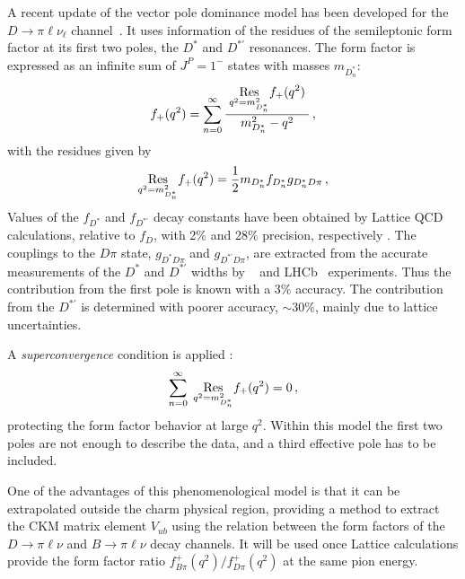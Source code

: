 A recent update of the vector pole dominance model has been developed for the $D \to \pi \ell \nu_\ell$ channel~\cite{Becirevic:2014kaa}.
It uses information of the residues of the semileptonic form factor at its first two poles, the $D^\ast$ 
and $D^{\ast '}$ resonances.  
The form factor is expressed as an infinite sum of $J^P =1^-$ states with masses $m_{D^\ast_n}$: 
\begin{eqnarray}
f_+(q^2) = \sum_{n=0}^\infty { \; \displaystyle{\underset{q^2= m_{D^\ast_n}^2}{\rm Res}} f_+(q^2)\;\over m_{D^\ast_n}^2-q^2} \,,
\label{ThreePole}
\end{eqnarray}
with the residues given by 
\begin{eqnarray}
\displaystyle{\underset{q^2=m_{D_n^\ast}^2}{\rm Res}} f_+(q^2)= {1\over 2} m_{D_n^\ast} f_{D_n^\ast} g_{D_n^\ast D\pi}\,, 
\label{Residua}
\end{eqnarray}
Values of the $f_{D^\ast}$ and $f_{D^{\ast '}}$ decay constants have been obtained by Lattice QCD calculations, 
relative to $f_{D}$, with 2$\%$ and 28$\%$ precision, respectively \cite{Becirevic:2014kaa}. 
The couplings to the $D\pi$ state, $g_{D^\ast D\pi}$ and $g_{D^{\ast '} D\pi}$, are extracted from the accurate 
measurements of the $D^\ast$ and  $D^{\ast '}$ widths by \babar~\cite{Lees:2013uxa,delAmoSanchez:2010vq} and LHCb~\cite{Aaij:2013sza} experiments. 
Thus the contribution from the first pole is known with a $3\%$ accuracy. 
The contribution from the $D^{\ast '}$ is determined with poorer accuracy, $\sim 30\%$, mainly due to lattice uncertainties.   

A {\it superconvergence} condition is applied \cite{Burdman:1996kr}: 
\begin{eqnarray}
\sum_{n=0}^\infty { \; \displaystyle{\underset{q^2=m_{D^\ast_n}^2}{\rm Res}} f_+(q^2) }= 0 \,,
\label{superconvergence}
\end{eqnarray}
protecting the form factor behavior at large $q^2$.
Within this model the first two poles are not enough to describe the data, and a third effective pole has to be included. 

One of the advantages of this phenomenological model 
is that it can be extrapolated outside the charm physical region, providing a method to 
extract the CKM matrix element $V_{ub}$ using the relation between the form factors of the 
$D\to \pi\ell \nu$ and $B\to \pi\ell \nu$ decay channels. It will be used once Lattice calculations provide
the form factor ratio $f^{+}_{B\pi}(q^2)/f^{+}_{D\pi}(q^2)$ at the same pion energy. 


